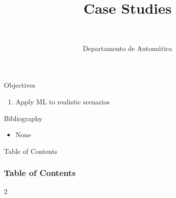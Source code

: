 \documentclass[10pt,compress]{beamer} %
\title[Case Studies]{Case Studies}
\author{\asignatura\\\carrera}
\institute{}
\date{Departamento de Automática}
\begin{document}
{\titlepageBlue
    \begin{frame}
        \titlepage
    \end{frame}
}

\institute{\asignatura}

\begin{frame}[plain]{}
   \begin{block}{Objectives}
      \begin{enumerate}
         \item Apply ML to realistic scenarios 
      \end{enumerate} 
   \end{block}

   \begin{block}{Bibliography}
	\begin{itemize}
        \item None
	\end{itemize}
   \end{block}
\end{frame}

{
\begin{frame}[shrink]{Table of Contents}

 	\frametitle{Table of Contents}
  	\begin{multicols}{2}
  		\tableofcontents
    \end{multicols}

\end{frame}
}
\end{document}
